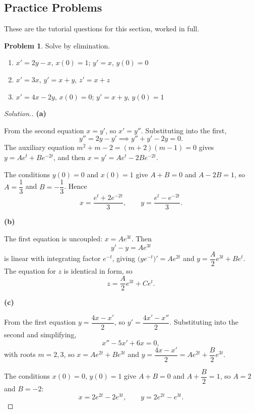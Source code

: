 \documentclass[11pt,a4paper]{article}
\theoremstyle{definition}
\newtheorem{problemx}{Problem}[subsection]
\newenvironment{problem}{\begin{problemx}}{\end{problemx}}
\newenvironment{solution}
  {\renewcommand{\qedsymbol}{}\begin{proof}[\textit{Solution}.]}
  {\end{proof}}
\newcommand{\subhead}[1]{%
  \par\medskip\noindent\textbf{#1}\par\nobreak\smallskip}
\begin{document}
\subsection{Practice Problems}

These are the tutorial questions for this section, worked in full.

\begin{problem}
Solve by elimination.
\begin{enumerate}
\item[(a)] $x' = 2y-x$, $x(0)=1$; $y' = x$, $y(0)=0$
\item[(b)] $x' = 3x$, $y' = x+y$, $z' = x+z$
\item[(c)] $x' = 4x-2y$, $x(0)=0$; $y' = x+y$, $y(0)=1$
\end{enumerate}
\end{problem}
\begin{solution}
\subhead{(a)}
From the second equation $x = y'$, so $x' = y''$. Substituting into the first,
$$y'' = 2y - y' \implies y''+y'-2y = 0 .$$
The auxiliary equation $m^2+m-2 = (m+2)(m-1) = 0$ gives
$y = Ae^{t} + Be^{-2t}$, and then $x = y' = Ae^{t} - 2Be^{-2t}$.

The conditions $y(0)=0$ and $x(0)=1$ give $A+B = 0$ and $A-2B = 1$, so
$A = \dfrac13$ and $B = -\dfrac13$. Hence
$$x = \frac{e^{t}+2e^{-2t}}{3},\qquad y = \frac{e^{t}-e^{-2t}}{3}.$$

\subhead{(b)}
The first equation is uncoupled: $x = Ae^{3t}$. Then
$$y'-y = Ae^{3t}$$
is linear with integrating factor $e^{-t}$, giving
$\big(ye^{-t}\big)' = Ae^{2t}$ and
$y = \dfrac{A}{2}e^{3t} + Be^{t}$. The equation for $z$ is identical in form, so
$$z = \frac{A}{2}e^{3t} + Ce^{t}.$$

\subhead{(c)}
From the first equation $y = \dfrac{4x-x'}{2}$, so
$y' = \dfrac{4x'-x''}{2}$. Substituting into the second and simplifying,
$$x'' - 5x' + 6x = 0 ,$$
with roots $m = 2, 3$, so $x = Ae^{2t}+Be^{3t}$ and
$y = \dfrac{4x-x'}{2} = Ae^{2t} + \dfrac{B}{2}e^{3t}$.

The conditions $x(0)=0$, $y(0)=1$ give $A+B = 0$ and $A+\dfrac{B}{2} = 1$, so
$A = 2$ and $B = -2$:
$$x = 2e^{2t}-2e^{3t},\qquad y = 2e^{2t}-e^{3t}.$$
\end{solution}
\end{document}
